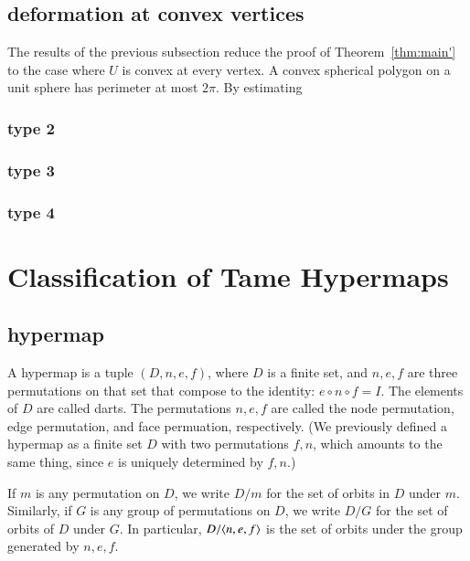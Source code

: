 \subsection{deformation at convex vertices}

The results of the previous subsection
reduce the proof of Theorem~\ref{thm:main'} to
the case where $U$ is convex at every vertex.  A convex
spherical polygon on a unit sphere has perimeter
at most $2\pi$.  By estimating 

\subsubsection{type 2}

\subsubsection{type 3}

\subsubsection{type 4}






 









\section{Classification of Tame Hypermaps}

\subsection{hypermap}

A hypermap is a tuple $(D,n,e,f)$, where $D$ is a finite
set, and $n,e,f$ are three permutations on that set that
compose to the identity:
$e\circ n\circ f = I$.  The elements of $D$ are called darts.
The permutations $n,e,f$ are called the node permutation,
edge permutation, and face permuation, respectively.
(We previously defined a hypermap as a finite set $D$ with
two permutations $f,n$, which amounts to the same thing,
since $e$ is uniquely determined by $f,n$.)

If $m$ is any permutation on $D$, we write $D/m$ for the
set of orbits in $D$ under $m$.  Similarly, if $G$ is any
group of permutations on $D$, we write $D/G$ for the set
of orbits of $D$ under $G$.  In particular, $D/\langle n,e,f\rangle$
is the set of orbits under the group generated by $n,e,f$.

